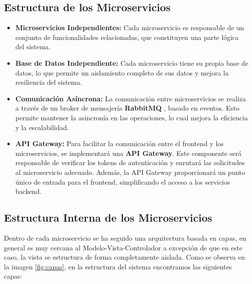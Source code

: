 \subsection{Estructura de los Microservicios}


\begin{itemize}
    \item \textbf{Microservicios Independientes:} Cada microservicio es responsable de un conjunto de funcionalidades relacionadas, que constituyen una parte lógica del sistema.
    \item \textbf{Base de Datos Independiente:} Cada microservicio tiene su propia base de datos, lo que permite un aislamiento completo de sus datos y mejora la resiliencia del sistema.
    \item \textbf{Comunicación Asíncrona:} La comunicación entre microservicios se realiza a través de un broker de mensajería \textbf{RabbitMQ} \cite{RabbitMQ}, basado en eventos. Esto permite mantener la asincronía en las operaciones, lo cual mejora la eficiencia y la escalabilidad.
    \item \textbf{API Gateway:} Para facilitar la comunicación entre el frontend y los microservicios, se implementará una \textbf{API Gateway}. Este componente será responsable de verificar los tokens de autenticación y enrutará las solicitudes al microservicio adecuado. Además, la API Gateway proporcionará un punto único de entrada para el frontend, simplificando el acceso a los servicios backend.
\end{itemize}


\subsection{Estructura Interna de los Microservicios}
Dentro de cada microservicio se ha seguido una arquitectura basada en capas, en general es muy cercana al Modelo-Vista-Controlador a excepción de que en este caso, la vista se estructura de forma completamente aislada. Como se observa en la imagen \ref{fig:capas}, en la estructura del sistema encontramos las siguientes capas:

